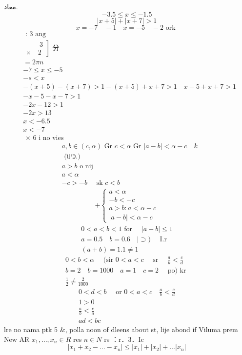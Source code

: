 \documentclass[12pt]{article}
\begin{document}
معاد.
\[
-3.5 \leq x \leq-1.5
\]
\[
|x+5|+|x+7|>1
\]
\[
x=-7 \quad-1 \quad x=-5 \quad-2 \text { ork }
\]
\[
\begin{aligned}
& \text { : } 3 \text { ang } \\
& \left.\begin{array}{l}
\qquad 3 \\
\times \quad 2
\end{array}\right] \text { 分 } \\
& =2 \pi n \\
& -7 \leq x \leq-5 \\
& -s<x \\
& -(x+5)-(x+7)>1-(x+5)+x+7>1 \quad x+5+x+7>1 \\
& -x-5-x-7>1 \\
& -2 x-12>1 \\
& -2 x>13 \\
& x<-6.5 \\
& x<-7 \\
& \text { × } 6 \text { i no vies }
\end{aligned}
\]
\[
\begin{aligned}
& a, b \in(c, \alpha) \text { Gr } c<\alpha \text { Gr }|a-b|<\alpha-c \quad k \\
& \text { (כינו.) } \\
& a>b \text { o nij } \\
& a<\alpha \\
& -c>-b \quad \text { sk } c<b
\end{aligned}
\]
\[
\begin{array}{r}
+\left\{\begin{array}{r}
a<\alpha \\
-b<-c \\
a>b: a<\alpha-c \\
|a-b|<\alpha-c
\end{array}\right.
\end{array}
\]
\[
\begin{gathered}
0<a<b<1 \text { for } \quad|a+b| \leq 1 \\
a=0.5 \quad b=0.6 \quad \mid \supset) \quad \text { I.r } \\
(a+b)=1.1 \neq 1
\end{gathered}
\]
\[
\begin{gathered}
0<b<\alpha \quad \text { (sir } 0<a<c \quad \text { sr } \quad \frac{a}{b}<\frac{c}{d} \\
b=2 \quad b=1000 \quad a=1 \quad c=2 \quad \text { po) kr } \\
\frac{1}{2} \neq \frac{2}{1000}
\end{gathered}
\]
\[
\begin{array}{ll}
0<d<b \quad \text { or } 0<a<c \quad \frac{a}{b}<\frac{c}{d} \\
1>0 \\
\frac{a}{b}<\frac{c}{a} \\
a d<b c
\end{array}
\]
lre no nama ptk 5 \&, polla noon of dleens about st, lije abond if Viluma prem New AR
\(x_{1}, \ldots, x_{n} \in R\) res \(n \in N\) rs ：r．3．Ic
\[
\left|x_{1}+x_{2}-\ldots-x_{n}\right| \leq\left|x_{1}\right|+\left|x_{2}\right|+\ldots\left|x_{n}\right|
\]
\end{document}
